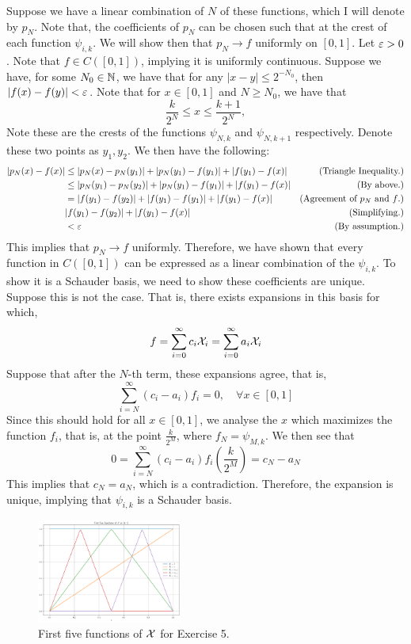 \begin{solution}
    \jump
    Suppose we have a linear combination of $N$ of these functions, which I will denote by $p_N$. Note that, the coefficients of $p_N$ can be chosen such that at the crest of each function $\psi_{i, k}$. We will show then that $p_N \to f$ uniformly on $[0, 1]$. Let $\varepsilon > 0$. Note that $f \in C([0, 1])$, implying it is uniformly continuous. Suppose we have, for some $N_0 \in \mathbb{N}$, we have that for any $|x - y| \leq 2^{-N_0}$, then $|f(x) - f(y)| < \varepsilon$. Note that for $x \in [0, 1]$ and $N \geq N_0$, we have that 
    \[\frac{k}{2^N} \leq x \leq \frac{k+1}{2^N},\]
    Note these are the crests of the functions $\psi_{N,k}$ and $\psi_{N, k+1}$ respectively. Denote these two points as $y_1, y_2$. We then have the following:
    \newpage
    \begin{align*}
        |p_N(x) - f(x)| &\leq |p_N(x) - p_N(y_1)| + |p_N(y_1) - f(y_1)| + |f(y_1) - f(x)| &\text{(Triangle Inequality.)}\\
        &\leq |p_N(y_1) - p_N(y_2)| + |p_N(y_1) - f(y_1)| + |f(y_1) - f(x)| &\text{(By above.)}\\
        &= |f(y_1) - f(y_2)| + |f(y_1) - f(y_1)| + |f(y_1) - f(x)| &\text{(Agreement of $p_N$ and $f$.)}\\
        &|f(y_1) - f(y_2)| + |f(y_1) - f(x)| &\text{(Simplifying.)}\\
        &< \varepsilon &\text{(By assumption.)}
    \end{align*}
    This implies that $p_N \to f$ uniformly. Therefore, we have shown that every function in $C([0, 1])$ can be expressed as a linear combination of the $\psi_{i, k}$. To show it is a Schauder basis, we need to show these coefficients are unique. Suppose this is not the case. That is, there exists expansions in this basis for which, 
    \[f = \sum_{i = 0}^\infty c_i\mathcal{X}_i = \sum_{i = 0}^\infty a_i\mathcal{X}_i\]
    Suppose that after the $N$-th term, these expansions agree, that is, 
    \[\sum_{i = N}^\infty (c_i - a_i) f_i = 0, \quad \forall x \in [0, 1]\]
    Since this should hold for all $x \in [0, 1]$, we analyse the $x$ which maximizes the function $f_i$, that is, at the point $\frac{k}{2^M}$, where $f_N = \psi_{M, k}$. We then see that 
    \[0 = \sum_{i = N}^\infty (c_i - a_i)f_i\left(\frac{k}{2^M}\right) = c_N - a_N\]
    This implies that $c_N = a_N$, which is a contradiction. Therefore, the expansion is unique, implying that $\psi_{i, k}$ is a Schauder basis. 
\end{solution}

\begin{figure}[!h]
    \centering
    \includegraphics[width = 0.425\textwidth]{Figures/Exercise5.png}
    \caption{First five functions of $\mathcal{X}$ for Exercise 5.}
    \label{fig:Exercise5}
\end{figure}
\clearpage

